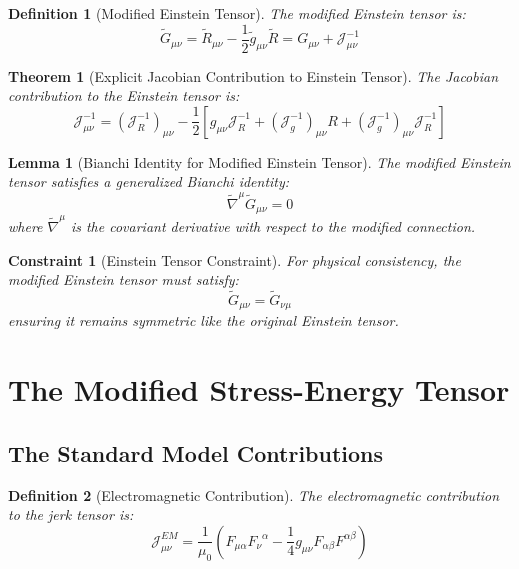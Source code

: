 \documentclass{article}
\newcommand{\tl}[1]{\tilde{#1}}
\newtheorem{theorem}{Theorem}
\newtheorem{lemma}{Lemma}
\newtheorem{definition}{Definition}
\newtheorem{constraint}{Constraint}
\begin{document}
\begin{definition}[Modified Einstein Tensor]
The modified Einstein tensor is:
\begin{equation}
\tl{G}_{\mu\nu} = \tl{R}_{\mu\nu} - \frac{1}{2}\tl{g}_{\mu\nu}\tl{R} = G_{\mu\nu} + \mathcal{J}^{-1}_{\mu\nu}
\end{equation}
\end{definition}

\begin{theorem}[Explicit Jacobian Contribution to Einstein Tensor]
The Jacobian contribution to the Einstein tensor is:
\begin{equation}
\mathcal{J}^{-1}_{\mu\nu} = (\mathcal{J}^{-1}_R)_{\mu\nu} - \frac{1}{2}[g_{\mu\nu}\mathcal{J}^{-1}_R + (\mathcal{J}^{-1}_g)_{\mu\nu}R + (\mathcal{J}^{-1}_g)_{\mu\nu}\mathcal{J}^{-1}_R]
\end{equation}
\end{theorem}

\begin{lemma}[Bianchi Identity for Modified Einstein Tensor]
The modified Einstein tensor satisfies a generalized Bianchi identity:
\begin{equation}
\tl{\nabla}^{\mu} \tl{G}_{\mu\nu} = 0
\end{equation}
where $\tl{\nabla}^{\mu}$ is the covariant derivative with respect to the modified connection.
\end{lemma}

\begin{constraint}[Einstein Tensor Constraint]
For physical consistency, the modified Einstein tensor must satisfy:
\begin{equation}
\tl{G}_{\mu\nu} = \tl{G}_{\nu\mu}
\end{equation}
ensuring it remains symmetric like the original Einstein tensor.
\end{constraint}

\section{The Modified Stress-Energy Tensor}

\subsection{The Standard Model Contributions}

\begin{definition}[Electromagnetic Contribution]
The electromagnetic contribution to the jerk tensor is:
\begin{equation}
\mathcal{J}^{EM}_{\mu\nu} = \frac{1}{\mu_0}\left(F_{\mu\alpha}F_{\nu}^{\;\;\alpha} - \frac{1}{4}g_{\mu\nu}F_{\alpha\beta}F^{\alpha\beta}\right)
\end{equation}
\end{definition}
\end{document}
